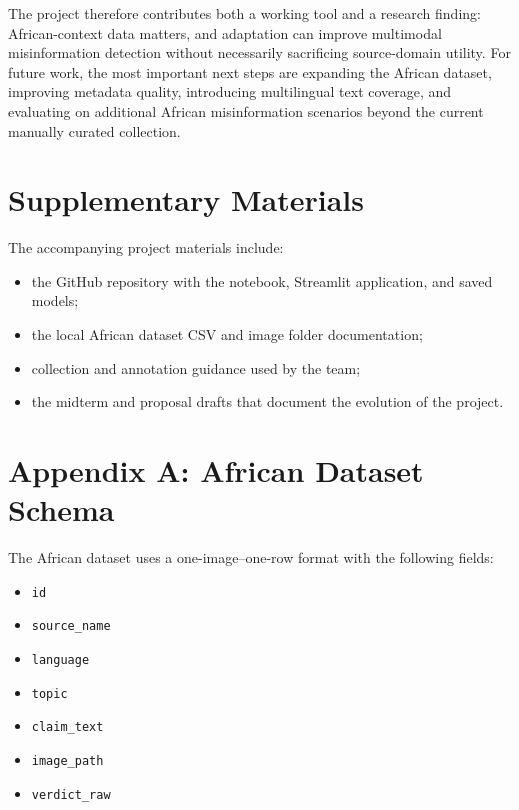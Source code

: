 \documentclass[a4paper,10.5pt,twoside]{article}
\begin{document}
The project therefore contributes both a working tool and a research finding: African-context data matters, and adaptation can improve multimodal misinformation detection without necessarily sacrificing source-domain utility. For future work, the most important next steps are expanding the African dataset, improving metadata quality, introducing multilingual text coverage, and evaluating on additional African misinformation scenarios beyond the current manually curated collection.

\section*{Supplementary Materials}
The accompanying project materials include:
\begin{itemize}[leftmargin=1.5em]
    \item the GitHub repository with the notebook, Streamlit application, and saved models;
    \item the local African dataset CSV and image folder documentation;
    \item collection and annotation guidance used by the team;
    \item the midterm and proposal drafts that document the evolution of the project.
\end{itemize}

\appendix
\section{Appendix A: African Dataset Schema}
The African dataset uses a one-image--one-row format with the following fields:
\begin{itemize}[leftmargin=1.5em]
    \item \texttt{id}
    \item \texttt{source\_name}
    \item \texttt{language}
    \item \texttt{topic}
    \item \texttt{claim\_text}
    \item \texttt{image\_path}
    \item \texttt{verdict\_raw}
\end{itemize}
\end{document}
